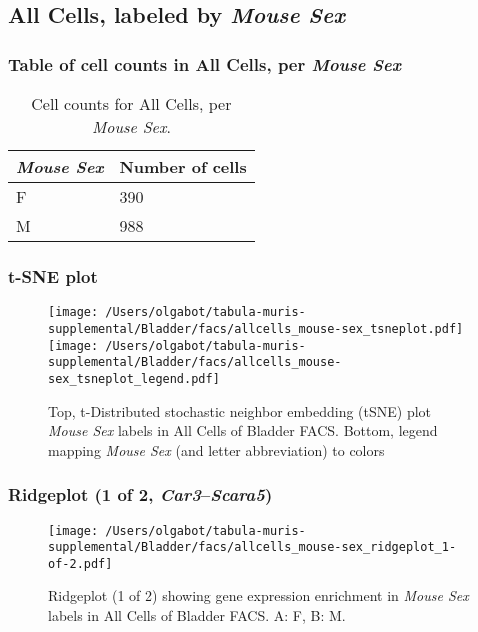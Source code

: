 \subsection{All Cells, labeled by \emph{Mouse Sex}}
\subsubsection{Table of cell counts in All Cells, per \emph{Mouse Sex}}\begin{table}[h]
\centering
\label{my-label}
\begin{tabular}{@{}ll@{}}
\toprule

\emph{Mouse Sex}& Number of cells \\ \midrule
F & 390 \\

M & 988 \\
\bottomrule
\end{tabular}
\caption{Cell counts for All Cells, per \emph{Mouse Sex}.}
\end{table}

\clearpage
\subsubsection{t-SNE plot}
\begin{figure}[h]
\centering
\texttt{[image: /Users/olgabot/tabula-muris-supplemental/Bladder/facs/allcells\_mouse-sex\_tsneplot.pdf]}
\texttt{[image: /Users/olgabot/tabula-muris-supplemental/Bladder/facs/allcells\_mouse-sex\_tsneplot\_legend.pdf]}
\caption{Top, t-Distributed stochastic neighbor embedding (tSNE) plot  \emph{Mouse Sex} labels in All Cells of Bladder FACS. Bottom, legend mapping \emph{Mouse Sex} (and letter abbreviation) to colors}
\end{figure}


\clearpage

\subsubsection{Ridgeplot (1 of 2, \emph{Car3}--\emph{Scara5})}
\begin{figure}[h]
\centering
\texttt{[image: /Users/olgabot/tabula-muris-supplemental/Bladder/facs/allcells\_mouse-sex\_ridgeplot\_1-of-2.pdf]}

\caption{ Ridgeplot (1 of 2)  showing gene expression enrichment in \emph{Mouse Sex} labels in All Cells of Bladder FACS. A: F, B: M.}
\end{figure}


